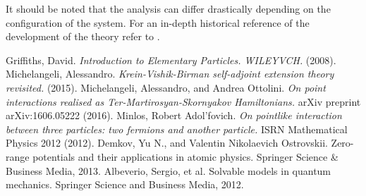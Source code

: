 \documentclass[11pt, a4paper, german]{article}
\theoremstyle{plain}
\theoremstyle{definition}
\theoremstyle{remark}
\numberwithin{equation}{section}
\numberwithin{theorem}{section}
\begin{document}
It should be noted that the analysis can differ drastically depending on the configuration of the system. For an in-depth historical reference of the development of the theory refer to \cite{A2}.

\medskip

\begin{thebibliography}{1}
Griffiths, David. \textit{Introduction to Elementary Particles. WILEYVCH.} (2008).
Michelangeli, Alessandro. \textit{Krein-Vishik-Birman self-adjoint extension theory revisited.} (2015).
Michelangeli, Alessandro, and Andrea Ottolini. \textit{On point interactions realised as Ter-Martirosyan-Skornyakov Hamiltonians.} arXiv preprint arXiv:1606.05222 (2016).
Minlos, Robert Adol'fovich. \textit{On pointlike interaction between three particles: two fermions and another particle.} ISRN Mathematical Physics 2012 (2012).
Demkov, Yu N., and Valentin Nikolaevich Ostrovskii. Zero-range potentials and their applications in atomic physics. Springer Science \& Business Media, 2013.
Albeverio, Sergio, et al. Solvable models in quantum mechanics. Springer Science and Business Media, 2012.
\end{thebibliography}
\end{document}
